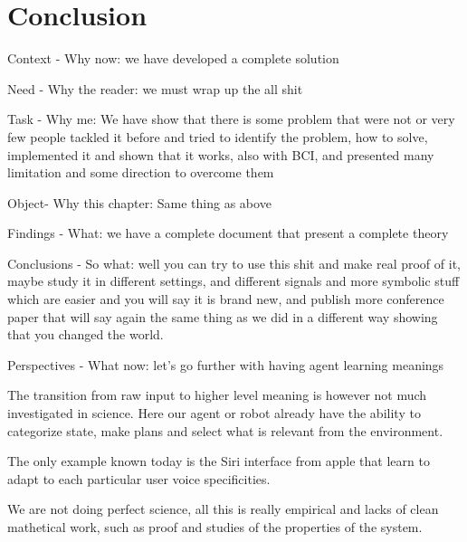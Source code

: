 \renewcommand{\chapterpath}{\allchapterspath/conclusion}
\renewcommand{\imgpath}{\chapterpath/img}

\chapter{Conclusion}
\label{chapter:conclusion}
\minitoc


Context - Why now: we have developed a complete solution

Need - Why the reader: we must wrap up the all shit 

Task - Why me: We have show that there is some problem that were not or very few people tackled it before and tried to identify the problem, how to solve, implemented it and shown that it works, also with BCI, and presented many limitation and some direction to overcome them

Object- Why this chapter: Same thing as above

Findings - What: we have a complete document that present a complete theory

Conclusions - So what: well you can try to use this shit and make real proof of it, maybe study it in different settings, and different signals and more symbolic stuff which are easier and you will say it is brand new, and publish more conference paper that will say again the same thing as we did in a different way showing that you changed the world.

Perspectives - What now: let's go further with having agent learning meanings

The transition from raw input to higher level meaning is however not much investigated in science. Here our agent or robot already have the ability to categorize state, make plans and select what is relevant from the environment.

The only example known today is the Siri interface from apple that learn to adapt to each particular user voice specificities.




We are not doing perfect science, all this is really empirical and lacks of clean mathetical work, such as proof and studies of the properties of the system. 


